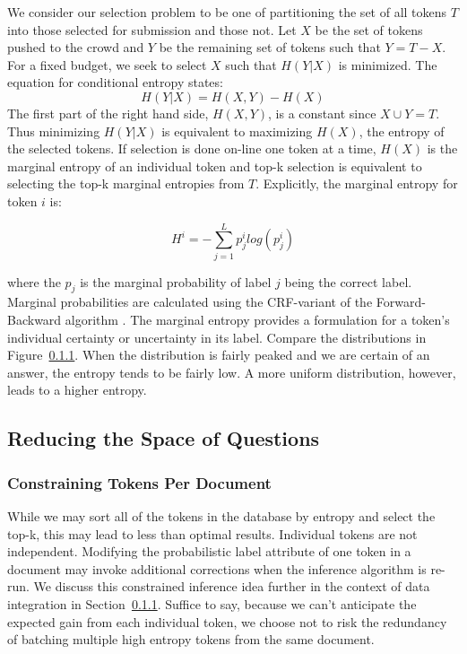 We consider our selection problem to be one of partitioning the set of all tokens $T$ into those selected for submission and those not.  Let $X$ be the set of tokens pushed to the crowd and $Y$ be the remaining set of tokens such that $Y = T - X$. For a fixed budget, we seek to select $X$ such that $H(Y|X)$ is minimized.  The equation for conditional entropy states:
\begin{equation}
H(Y|X) = H(X,Y) - H(X)
\end{equation}
The first part of the right hand side, $H(X,Y)$, is a constant since $X \cup Y = T$.  Thus minimizing $H(Y|X)$ is equivalent to maximizing $H(X)$, the entropy of the selected tokens.  If selection is done on-line one token at a time, $H(X)$ is the marginal entropy of an individual token and top-k selection is equivalent to selecting the top-k marginal entropies from $T$.  Explicitly, the marginal entropy for token $i$ is:

\begin{equation}
H^{i} = -\sum^{L}_{j=1}p^{i}_{j}log(p^{i}_{j})
\end{equation}

where the $p_{j}$ is the marginal probability of label $j$ being the correct label.  Marginal probabilities are calculated using the CRF-variant of the Forward-Backward algorithm \cite{}.  The marginal entropy provides a formulation for a token's individual certainty or uncertainty in its label.  Compare the distributions in Figure~\ref{}.  When the distribution is fairly peaked and we are certain of an answer, the entropy tends to be fairly low.  A more uniform distribution, however, leads to a higher entropy.

\subsection{Reducing the Space of Questions}
\subsubsection{Constraining Tokens Per Document}
While we may sort all of the tokens in the database by entropy and select the top-k, this may lead to less than optimal results.  Individual tokens are not independent.  Modifying the probabilistic label attribute of one token in a document may invoke additional corrections when the inference algorithm is re-run.  We discuss this constrained inference idea further in the context of data integration in Section~\ref{}.  Suffice to say, because we can't anticipate the expected gain from each individual token, we choose not to risk the redundancy of batching multiple high entropy tokens from the same document.

